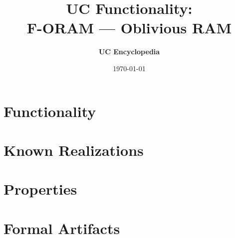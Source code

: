 \documentclass[11pt,a4paper]{article}
\title{\textbf{\Large UC Functionality:}\\[0.2em] \Large F-ORAM --- Oblivious RAM}
\author{\textbf{UC Encyclopedia}}
\date{\today}
\newtheorem{functionality}{Functionality}
\begin{document}
\maketitle

\begin{abstract}
\end{abstract}

\section{Functionality}

%

\section{Known Realizations}


\section{Properties}


\section{Formal Artifacts}

\end{document}
